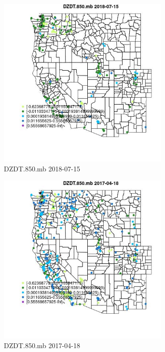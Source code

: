 \begin{figure} 
\centering  
\includegraphics[width=0.77\textwidth]{Code_Outputs/Report_ML_input_PM25_Step4_part_e_de_duplicated_aves_compiled_2019-05-21wNAs_MapObsDZDT850mb2018-07-15.jpg} 
\caption{\label{fig:Report_ML_input_PM25_Step4_part_e_de_duplicated_aves_compiled_2019-05-21wNAsMapObsDZDT850mb2018-07-15}DZDT.850.mb 2018-07-15} 
\end{figure} 
 

\begin{figure} 
\centering  
\includegraphics[width=0.77\textwidth]{Code_Outputs/Report_ML_input_PM25_Step4_part_e_de_duplicated_aves_compiled_2019-05-21wNAs_MapObsDZDT850mb2017-04-18.jpg} 
\caption{\label{fig:Report_ML_input_PM25_Step4_part_e_de_duplicated_aves_compiled_2019-05-21wNAsMapObsDZDT850mb2017-04-18}DZDT.850.mb 2017-04-18} 
\end{figure} 
 

